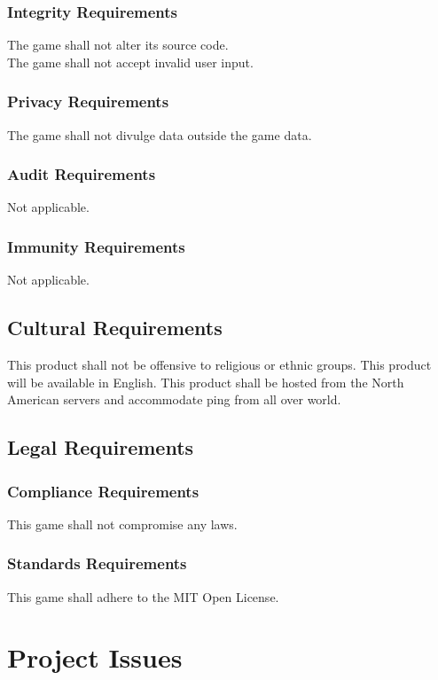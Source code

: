 \documentclass[11pt, oneside]{article}   	%
\begin{document}
\subsubsection*{Integrity Requirements}
The game shall not alter its source code.\\
The game shall not accept invalid user input.\\


\subsubsection*{Privacy Requirements}
The game shall not divulge data outside the game data.


\subsubsection*{Audit Requirements}
Not applicable.


\subsubsection*{Immunity Requirements}
Not applicable.


\subsection*{Cultural Requirements}
This product shall not be offensive to religious or ethnic groups. This product will be available in English. This product shall be hosted from the North American servers and accommodate ping from all over world.


\subsection*{Legal Requirements}
\subsubsection*{Compliance Requirements}
This game shall not compromise any laws.


\subsubsection*{Standards Requirements}
This game shall adhere to the MIT Open License.


\newpage
\section*{Project Issues}
\end{document}

